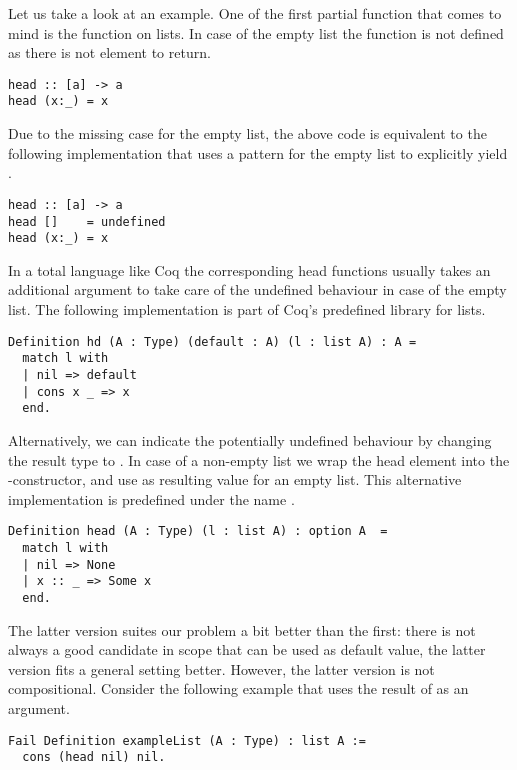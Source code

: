 Let us take a look at an example.
One of the first partial function that comes to mind is the  function on lists.
In case of the empty list the function is not defined as there is not element to return.

\begin{verbatim}
head :: [a] -> a
head (x:_) = x
\end{verbatim}

\noindent 
Due to the missing case for the empty list, the above code is
equivalent to the following implementation that uses a pattern for the
empty list to explicitly yield .

\begin{verbatim}
head :: [a] -> a
head []    = undefined
head (x:_) = x
\end{verbatim}

In a total language like Coq the corresponding head functions usually
takes an additional argument to take care of the undefined behaviour
in case of the empty list.
The following implementation is part of Coq's predefined library for
lists.

\begin{verbatim}
Definition hd (A : Type) (default : A) (l : list A) : A = 
  match l with
  | nil => default
  | cons x _ => x
  end.
\end{verbatim}

Alternatively, we can indicate the potentially undefined behaviour by
changing the result type to .
In case of a non-empty list we wrap the head element into the
-constructor, and use  as
resulting value for an empty list.
This alternative implementation is predefined under the name
.

\begin{verbatim}
Definition head (A : Type) (l : list A) : option A  = 
  match l with
  | nil => None
  | x :: _ => Some x
  end.
\end{verbatim}

The latter version suites our problem a bit better than the first:
there is not always a good candidate in scope that can be used as
default value, the latter version fits a general setting better.
However, the latter version is not compositional.
Consider the following example that uses the result of
 as an argument.

\begin{verbatim}
Fail Definition exampleList (A : Type) : list A :=
  cons (head nil) nil.
\end{verbatim}

